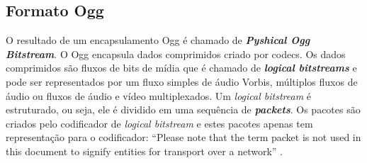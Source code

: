 




\subsection{Formato Ogg}

O resultado de um encapsulamento Ogg é chamado de \textbf{\textit{Pyshical Ogg Bitstream}}. O Ogg encapsula dados comprimidos criado por codecs. Os dados comprimidos são fluxos de bits de mídia que é chamado de \textbf{\textit{logical bitstreams}} e pode ser representados por um fluxo simples de áudio Vorbis, múltiplos fluxos de áudio ou fluxos de áudio e vídeo multiplexados. Um \textit{logical bitstream} é estruturado, ou seja, ele é dividido em uma sequência de \textbf{\textit{packets}}. Os pacotes são criados pelo codificador de \textit{logical bitstream} e estes pacotes apenas tem representação para o codificador: ``Please note that the term packet is not used in this document to signify entities for transport over a network'' \cite{ogg}.

